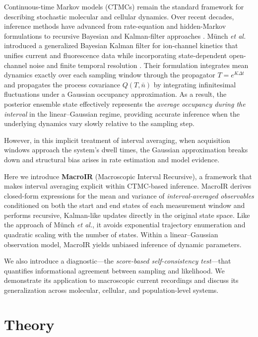 \documentclass[9pt]{elife}
\begin{document}
Continuous-time Markov models (CTMCs) remain the standard framework for describing stochastic molecular and cellular dynamics. Over recent decades, inference methods have advanced from rate-equation and hidden-Markov formulations to recursive Bayesian and Kalman-filter approaches \citep{Csanady2006, Siekmann2011, Bronson2013}. 
Münch \emph{et al.} introduced a generalized Bayesian Kalman filter for ion-channel kinetics that unifies current and fluorescence data while incorporating state-dependent open-channel noise and finite temporal resolution \citep{Munch2022}. 
Their formulation integrates mean dynamics exactly over each sampling window through the propagator $T = e^{K\Delta t}$ and propagates the process covariance $Q(T,\bar n)$ by integrating infinitesimal fluctuations under a Gaussian occupancy approximation. 
As a result, the posterior ensemble state effectively represents the \emph{average occupancy during the interval} in the linear–Gaussian regime, providing accurate inference when the underlying dynamics vary slowly relative to the sampling step.

However, in this implicit treatment of interval averaging, when acquisition windows approach the system’s dwell times, the Gaussian approximation breaks down and structural bias arises in rate estimation and model evidence.

Here we introduce \textbf{MacroIR} (Macroscopic Interval Recursive), a framework that makes interval averaging explicit within CTMC-based inference. 
MacroIR derives closed-form expressions for the mean and variance of \emph{interval-averaged observables} conditioned on both the start and end states of each measurement window and performs recursive, Kalman-like updates directly in the original state space. 
Like the approach of Münch \emph{et al.}, it avoids exponential trajectory enumeration and quadratic scaling with the number of states. 
Within a linear–Gaussian observation model, MacroIR yields unbiased inference of dynamic parameters.

We also introduce a diagnostic—the \emph{score-based self-consistency test}—that quantifies informational agreement between sampling and likelihood. 
We demonstrate its application to macroscopic current recordings and discuss its generalization across molecular, cellular, and population-level systems.


\section*{Theory}
\end{document}
